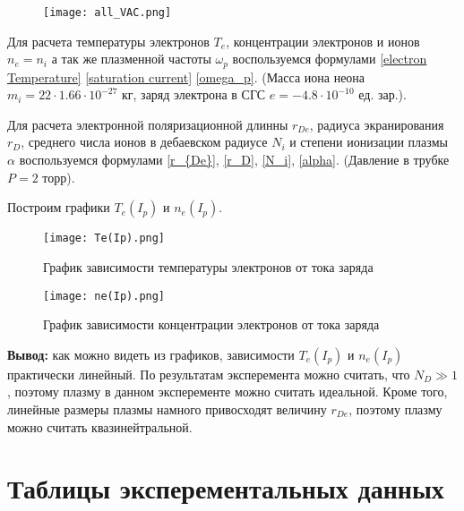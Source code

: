     \begin{figure}
        \centering
        \texttt{[image: all\_VAC.png]}
    \end{figure}

    Для расчета температуры электронов $T_e$, концентрации электронов и ионов
    $n_e = n_i$ а так же плазменной частоты $\omega_p$ воспользуемся формулами 
    \eqref{electron Temperature} \eqref{saturation current} \eqref{omega_p}. 
    (Масса иона неона $m_i = 22 \cdot 1.66 \cdot 10^{-27}$ кг, заряд электрона в СГС $e = -4.8 \cdot 10^{-10}$ ед. зар.).

    

    Для расчета электронной поляризационной длинны $r_{De}$, радиуса экранирования $r_D$, среднего числа ионов в
    дебаевском радиусе $N_i$ и степени ионизации плазмы $\alpha$ воспользуемся формулами \eqref{r_{De}}, \eqref{r_D}, \eqref{N_i}, \eqref{alpha}.
    (Давление в трубке $P = 2$ торр).

    

    Построим графики $T_e(I_p)$ и $n_e(I_p)$.

    \begin{figure}
        \centering
        \texttt{[image: Te(Ip).png]}
        \caption{График зависимости температуры электронов от тока заряда}
    \end{figure}

    \begin{figure}
        \centering
        \texttt{[image: ne(Ip).png]}
        \caption{График зависимости концентрации электронов от тока заряда}
    \end{figure}

    \textbf{Вывод:} как можно видеть из графиков, зависимости $T_e(I_p)$ и $n_e(I_p)$ практически линейный. 
    По результатам эксперемента можно считать, что $N_D \gg 1$, поэтому плазму в данном эксперементе можно считать идеальной.
    Кроме того, линейные размеры плазмы намного привосходят величину $r_{De}$,
    поэтому плазму можно считать квазинейтральной.

    \section{Таблицы эксперементальных данных}

    
    
    
    

